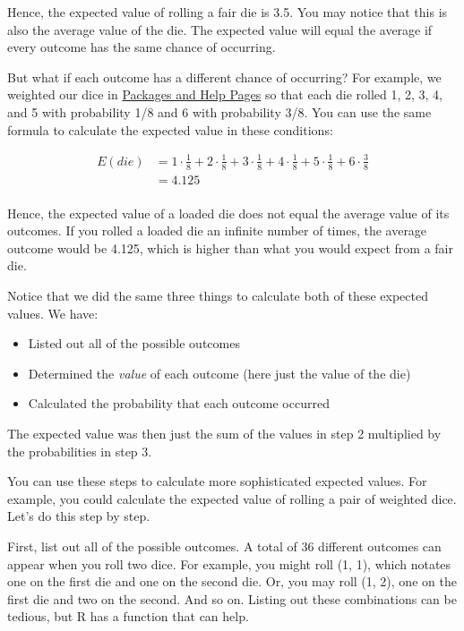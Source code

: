 \documentclass[
  letterpaper,
  DIV=11,
  numbers=noendperiod]{scrbook}
\providecommand{\tightlist}{%
  \setlength{\itemsep}{0pt}\setlength{\parskip}{0pt}}
\begin{document}
Hence, the expected value of rolling a fair die is 3.5. You may notice
that this is also the average value of the die. The expected value will
equal the average if every outcome has the same chance of occurring.

But what if each outcome has a different chance of occurring? For
example, we weighted our dice in
\hyperref[sec-packages-and-help]{Packages and Help Pages} so that each
die rolled 1, 2, 3, 4, and 5 with probability 1/8 and 6 with probability
3/8. You can use the same formula to calculate the expected value in
these conditions:

\[
\begin{array}{rl}
  E(die) & = 1 \cdot \frac{1}{8} +  2 \cdot \frac{1}{8} + 3 \cdot \frac{1}{8} + 4 \cdot \frac{1}{8} + 5 \cdot \frac{1}{8} + 6 \cdot \frac{3}{8}\\
  & = 4.125\\
  \end{array} 
\]

Hence, the expected value of a loaded die does not equal the average
value of its outcomes. If you rolled a loaded die an infinite number of
times, the average outcome would be 4.125, which is higher than what you
would expect from a fair die.

Notice that we did the same three things to calculate both of these
expected values. We have:

\begin{itemize}
\tightlist
\item
  Listed out all of the possible outcomes
\item
  Determined the \emph{value} of each outcome (here just the value of
  the die)
\item
  Calculated the probability that each outcome occurred
\end{itemize}

The expected value was then just the sum of the values in step 2
multiplied by the probabilities in step 3.

You can use these steps to calculate more sophisticated expected values.
For example, you could calculate the expected value of rolling a pair of
weighted dice. Let's do this step by step.

First, list out all of the possible outcomes. A total of 36 different
outcomes can appear when you roll two dice. For example, you might roll
(1, 1), which notates one on the first die and one on the second die.
Or, you may roll (1, 2), one on the first die and two on the second. And
so on. Listing out these combinations can be tedious, but R has a
function that can help.
\end{document}
